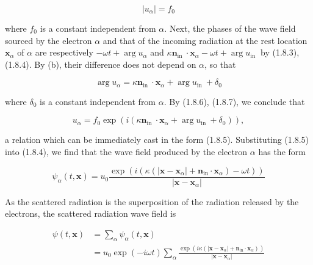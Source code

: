 \documentclass{article}
\begin{document}
\begin{equation*}
\left|u_{\alpha}\right|=f_{0} \tag{1.8.6}
\end{equation*}
 
where $f_{0}$ is a constant independent from $\alpha$. Next, the phases of the wave field sourced by the electron $\alpha$ and that of the incoming radiation at the rest location $\boldsymbol{x}_{\alpha}$ of $\alpha$ are respectively $-\omega t+\arg u_{\alpha}$ and $\kappa \boldsymbol{n}_{\text {in }} \cdot \boldsymbol{x}_{\alpha}-\omega t+\arg u_{\text {in }}$ by (1.8.3), (1.8.4). By (b), their difference does not depend on $\alpha$, so that
 
\begin{equation*}
\arg u_{\alpha}=\kappa \boldsymbol{n}_{\text {in }} \cdot \boldsymbol{x}_{\alpha}+\arg u_{\text {in }}+\delta_{0} \tag{1.8.7}
\end{equation*}
 
where $\delta_{0}$ is a constant independent from $\alpha$. By (1.8.6), (1.8.7), we conclude that
 
\begin{equation*}
u_{\alpha}=f_{0} \exp \left(i\left(\kappa \boldsymbol{n}_{\text {in }} \cdot \boldsymbol{x}_{\alpha}+\arg u_{\text {in }}+\delta_{0}\right)\right), \tag{1.8.8}
\end{equation*}
 
a relation which can be immediately cast in the form (1.8.5).
Substituting (1.8.5) into (1.8.4), we find that the wave field produced by the electron $\alpha$ has the form
 
\begin{equation*}
\psi_{\alpha}(t, \boldsymbol{x})=u_{0} \frac{\exp \left(i\left(\kappa\left(\left|\boldsymbol{x}-\boldsymbol{x}_{\alpha}\right|+\boldsymbol{n}_{\mathrm{in}} \cdot \boldsymbol{x}_{\alpha}\right)-\omega t\right)\right)}{\left|\boldsymbol{x}-\boldsymbol{x}_{\alpha}\right|} \tag{1.8.9}
\end{equation*}
 

As the scattered radiation is the superposition of the radiation released by the electrons, the scattered radiation wave field is
 
\begin{align*}
\psi(t, \boldsymbol{x}) & =\sum_{\alpha} \psi_{\alpha}(t, \boldsymbol{x})  \tag{1.8.10}\\
& =u_{0} \exp (-i \omega t) \sum_{\alpha} \frac{\exp \left(i \kappa\left(\left|\boldsymbol{x}-\boldsymbol{x}_{\alpha}\right|+\boldsymbol{n}_{\mathrm{in}} \cdot \boldsymbol{x}_{\alpha}\right)\right)}{\left|\boldsymbol{x}-\boldsymbol{x}_{\alpha}\right|}
\end{align*}
 
\end{document}
